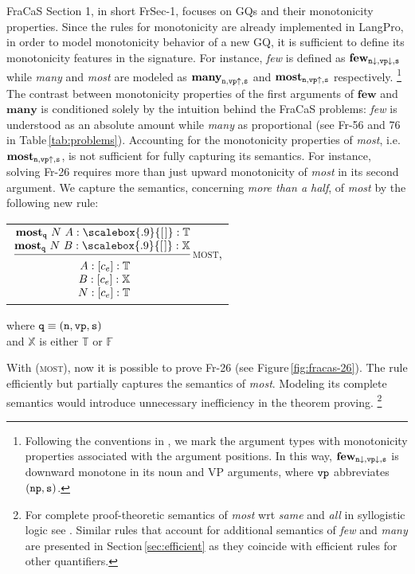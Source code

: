 \documentclass[11pt]{article}
\makeatletter
\newcommand{\elist}{\scalebox{.9}{[\kern1pt]}}
\newcommand{\rulen}[1]{{\normalfont\textsc{#1}}}
\newcommand{\addlater}[1]{\todo[line,size=\tiny]{#1}}
\newcommand{\synt}[1]{\textbf{#1}}
\newcommand{\X}{\mathbb{X}}
\newcommand{\T}{\mathbb{T}}
\newcommand{\F}{\mathbb{F}}
\newcommand{\np}{{\tt np}}
\newcommand{\sen}{{\tt s}}
\newcommand{\vp}{{\tt vp}}
\newcommand{\nou}{{\tt n}}
\newcommand{\qu}{{\tt q}}
\newcommand{\nonBranchingRule}[3][]{
\begin{tabular}{@{}c@{}}
$\dfrac{
	\begin{tabular}{@{}r@{}}
			#2
	\end{tabular}}
{
	\raisebox{-4pt}{
		\begin{tabular}[t]{@{}r@{}}
   			#3
	\end{tabular}}
}$#1
\end{tabular}}
\makeatother
\begin{document}

%

FraCaS Section 1, in short FrSec-1, focuses on GQs and their monotonicity properties.
Since the rules for monotonicity are already implemented in LangPro, in order to model monotonicity behavior of a new GQ, it is sufficient to define its monotonicity features in the signature.
For instance, {\em few} is defined as $\synt{few}_{\nou\downarrow,\vp\downarrow,\sen}$ while {\em many} and {\em most} are modeled as $\synt{many}_{\nou,\vp\uparrow,\sen}$ and $\synt{most}_{\nou,\vp\uparrow,\sen}$ respectively.%
%
\footnote{Following the conventions in \cite{valencia91categorial}, we mark the argument types with monotonicity properties associated with the argument positions.
In this way, $\synt{few}_{\nou\downarrow,\vp\downarrow,\sen}$ is downward monotone in its noun and VP arguments, where $\vp$ abbreviates $(\np,\sen)$. 
}
The contrast between monotonicity properties of the first arguments of $\synt{few}$ and $\synt{many}$ is conditioned solely by the intuition behind the FraCaS problems: {\em few} is understood as an absolute amount while {\em many} as proportional (see Fr-56 and 76 in Table\,\ref{tab:problems}).  
Accounting for the monotonicity properties of {\em most}, i.e. $\synt{most}_{\nou,\vp\uparrow,\sen}$, is not sufficient for fully capturing its semantics.
For instance, solving Fr-26 requires more than just upward monotonicity of {\em most} in its second argument.
We capture the semantics, concerning {\em more than a half}, of {\em most} by the following new rule:

\begin{center}
\nonBranchingRule[\rulen{most}, ]
{$\synt{most}_\qu~N~A : \elist : \T$ 
\\$\synt{most}_\qu~N~B : \elist : \X$}
{$A: [c_e] :\T$ \\ $B: [c_e]: \X$ \\ $N: [c_e]: \T$}
\parbox[b]{33mm}{where $\qu \equiv (\nou,\vp,\sen)$\\
and $\X$ is either $\T$ or $\F$}
\end{center} 
%
With (\rulen{most}), now it is possible to prove Fr-26 (see Figure\,\ref{fig:fracas-26}). 
The rule efficiently but partially captures the semantics of {\em most}.
Modeling its complete semantics would introduce unnecessary inefficiency in the theorem proving.%
%
\footnote{
For complete proof-theoretic semantics of {\em most} wrt {\em same} and {\em all} in syllogistic logic see .   
Similar rules that account for additional semantics of {\em few} and {\em many} are presented in Section\,\ref{sec:efficient} as they coincide with efficient rules for other quantifiers.  
}
\end{document}
